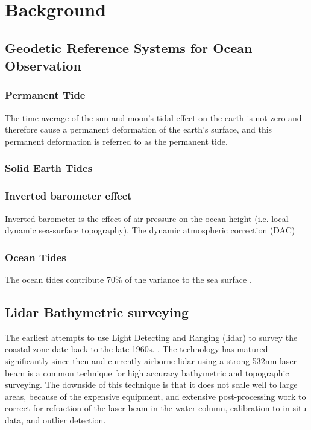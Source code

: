
\chapter{Background}

\section{Geodetic Reference Systems for Ocean Observation}
\subsection{Permanent Tide}
The time average of the sun and moon's tidal effect on the earth is not zero and therefore cause a permanent deformation of the earth's surface, and this permanent deformation is referred to as the permanent tide. 

\subsection{Solid Earth Tides}
\subsection{Inverted barometer effect}
Inverted barometer is the effect of air pressure on the ocean height (i.e. local dynamic sea-surface topography)\parencite{comparison guide}. The dynamic atmospheric correction (DAC) 
\subsection{Ocean Tides}

The ocean tides contribute 70\% of the variance to the sea surface \parencite{comparison guide}.




\section{Lidar Bathymetric surveying}

The earliest attempts to use Light Detecting and Ranging (lidar) to survey the coastal zone date back to the late 1960s. \parencite{Bailly2016}. The technology has matured significantly since then and currently airborne lidar using a strong 532nm laser beam is a common technique for high accuracy bathymetric and topographic surveying. The downside of this technique is that it does not scale well to large areas, because of the expensive equipment, and extensive post-processing work to correct for refraction of the laser beam in the water column, calibration to in situ data, and outlier detection.

